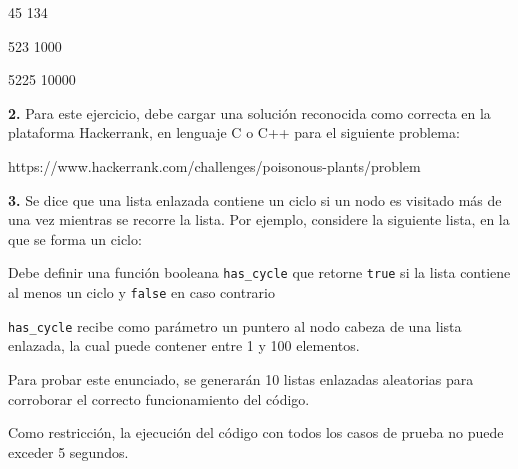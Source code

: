 \documentclass{article}
\begin{document}
45 134

523 1000

5225 10000 \newline



\textbf{2. } Para este ejercicio, debe cargar una solución reconocida como correcta en la plataforma Hackerrank, en lenguaje C o C++ para el siguiente problema: 

https://www.hackerrank.com/challenges/poisonous-plants/problem \newline


\textbf{3. } Se dice que una lista enlazada contiene un ciclo si un nodo es visitado más de una vez mientras se recorre la lista. Por ejemplo, considere la siguiente lista, en la que se forma un ciclo: \newline


 \newline

Debe definir una función booleana \verb|has_cycle| que retorne \verb|true| si la lista contiene al menos un ciclo y \verb|false| en caso contrario

\verb|has_cycle| recibe como parámetro un puntero al nodo cabeza de una lista enlazada, la cual puede contener entre 1 y 100 elementos.

Para probar este enunciado, se generarán 10 listas enlazadas aleatorias para corroborar el correcto funcionamiento del código.

Como restricción, la ejecución del código con todos los casos de prueba no puede exceder 5 segundos.
\end{document}
